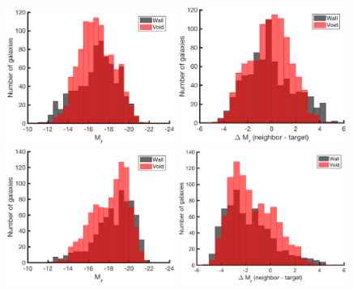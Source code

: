 \begin{figure}
    \includegraphics[width=0.49\textwidth]{Images/smallScaleEnvironment/1sig_dwarf_I06relations_rabsmag_abs_hist}
    \includegraphics[width=0.49\textwidth]{Images/smallScaleEnvironment/1sig_dwarf_I06relations_Drabsmag_abs_hist}
    \includegraphics[width=0.49\textwidth]{Images/smallScaleEnvironment/1sig_dwarf_I06relations_rabsmag_vir_hist}
    \includegraphics[width=0.49\textwidth]{Images/smallScaleEnvironment/1sig_dwarf_I06relations_Drabsmag_vir_hist}

\end{figure}
